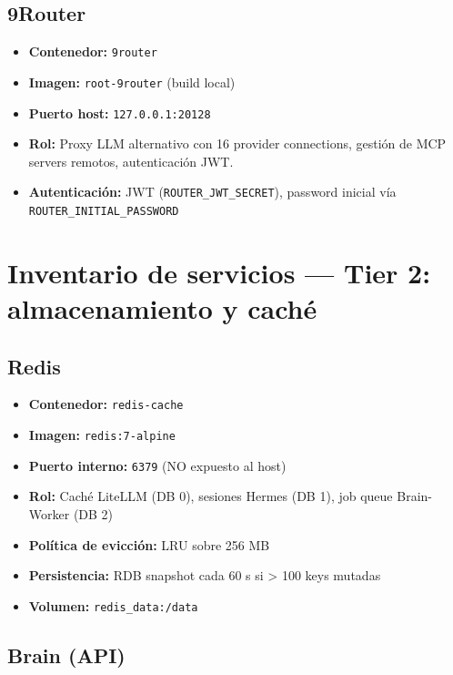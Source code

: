\documentclass[11pt,a4paper]{article}
\newcommand{\dato}[2]{\textbf{\color{hermesblue}#1:} #2}
\begin{document}
\subsection{9Router}

\begin{itemize}[leftmargin=*,itemsep=1pt]
\item \dato{Contenedor}{\texttt{9router}}
\item \dato{Imagen}{\texttt{root-9router} (build local)}
\item \dato{Puerto host}{\texttt{127.0.0.1:20128}}
\item \dato{Rol}{Proxy LLM alternativo con 16 provider connections, gestión de MCP servers remotos, autenticación JWT.}
\item \dato{Autenticación}{JWT (\texttt{ROUTER\_JWT\_SECRET}), password inicial vía \texttt{ROUTER\_INITIAL\_PASSWORD}}
\end{itemize}

\newpage

\section{Inventario de servicios — Tier 2: almacenamiento y caché}

\subsection{Redis}

\begin{itemize}[leftmargin=*,itemsep=1pt]
\item \dato{Contenedor}{\texttt{redis-cache}}
\item \dato{Imagen}{\texttt{redis:7-alpine}}
\item \dato{Puerto interno}{\texttt{6379} (NO expuesto al host)}
\item \dato{Rol}{Caché LiteLLM (DB 0), sesiones Hermes (DB 1), job queue Brain-Worker (DB 2)}
\item \dato{Política de evicción}{LRU sobre 256 MB}
\item \dato{Persistencia}{RDB snapshot cada 60 s si > 100 keys mutadas}
\item \dato{Volumen}{\texttt{redis\_data:/data}}
\end{itemize}

\subsection{Brain (API)}
\end{document}
